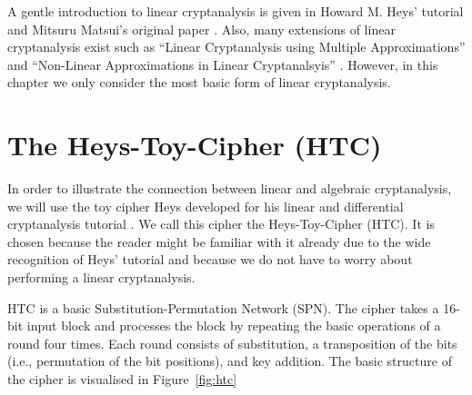 A gentle introduction to linear cryptanalysis is given in Howard M. Heys' tutorial \cite{Heys2002} and Mitsuru Matsui's original paper \cite{Matsui1993}. Also, many extensions of linear cryptanalysis exist such as ``Linear Cryptanalysis using Multiple Approximations'' \cite{Robshaw1994} and ``Non-Linear  Approximations in Linear Cryptanalsyis'' \cite{Knudsen1996}. However, in this chapter we only consider the most basic form of linear cryptanalysis.

\section{The Heys-Toy-Cipher (HTC)}

In order to illustrate the connection between linear and algebraic cryptanalysis, we will use  the toy cipher Heys developed for his linear and differential cryptanalysis tutorial \cite{Heys2002}. We call this cipher the Heys-Toy-Cipher (HTC). It is chosen because the reader might be familiar with it already due to the wide recognition of Heys' tutorial and because we do not have to worry about performing a linear cryptanalysis.

HTC is a basic Substitution-Permutation Network (SPN). The cipher takes a 16-bit input block and processes the block by repeating the basic operations of a round four times. Each round consists of substitution, a transposition of the bits (i.e., permutation of the bit positions), and key addition. The basic structure of the cipher is visualised in Figure~\ref{fig:htc}

